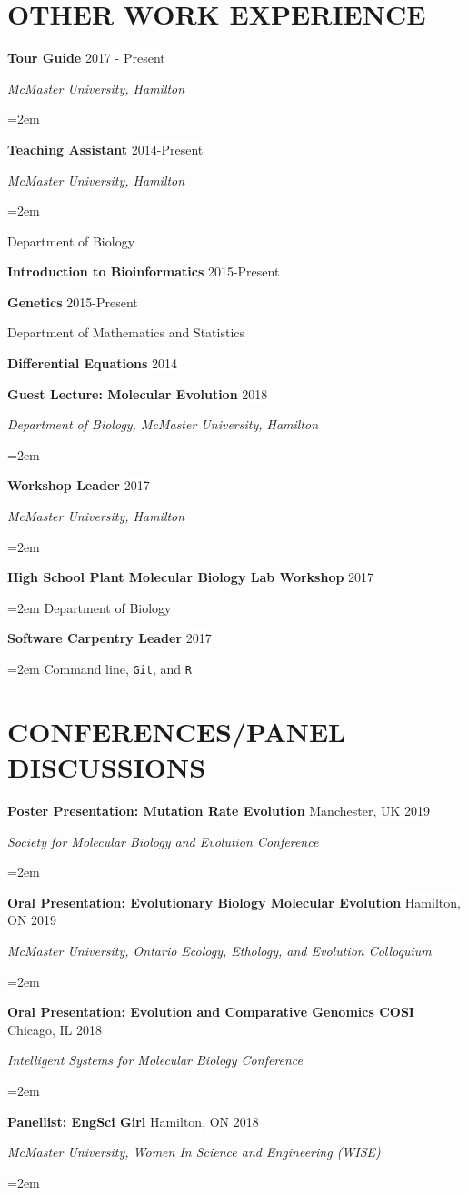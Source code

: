 \documentclass[paper=a4,fontsize=11pt]{scrartcl}	 			%
\renewcommand{\refname}{PUBLICATIONS}
\newcommand{\NewPart}[1]{\section*{\uppercase{#1}}}
\newcommand{\EducationEntry}[4]{
		\noindent \textbf{#1} \hfill 					%
		\colorbox{White}{%
			\parbox{10em}{%
			\hfill\color{Black}#2}} \par				%
		\noindent \textit{#3} \par					%
		\noindent\hangindent=2em\hangafter=0 \small #4 	%
		\normalsize \par}
\newcommand{\WorkEntry}[4]{						%
		\noindent \textbf{#1} \hfill 					%
		\colorbox{White}{\color{Black}#2} \par		%
		\noindent \textit{#3} \par					%
		\noindent\hangindent=2em\hangafter=0 \small #4 	%
		\normalsize \par}
\newcommand{\WorkEntryB}[3]{						%
	\noindent \textbf{#1} \hfill 					%
	\colorbox{White}{\color{Black}#2} \par		%
	\noindent \textit{#3} \par					%
	\noindent\hangindent=2em\hangafter=0 \small  	%
	\normalsize \par}
\newcommand{\WorkEntryD}[3]{						%
	\indent \textbf{#1} \hfill 					%
	\colorbox{White}{\color{Black}#2} \par		%
	\hangindent=2em\hangafter=0 \small  #3 \par
    \normalsize }
\newcommand{\WorkEntryE}[2]{						%
	\indent \indent \textbf{#1} \hfill 					%
	\colorbox{White}{\color{Black}#2} \par}
\begin{document}
%
\NewPart{Other Work Experience}{}
\WorkEntryB{Tour Guide}{2017 - Present}{McMaster University, Hamilton}
\WorkEntryB{Teaching Assistant}{2014-Present}{McMaster University, Hamilton}
\indent Department of Biology

	\WorkEntryE{Introduction to Bioinformatics}{2015-Present}
	\WorkEntryE{Genetics}{2015-Present}
	\indent Department of Mathematics and Statistics
	
	\WorkEntryE{Differential Equations}{2014}
\WorkEntryB{Guest Lecture: Molecular Evolution}{2018}{Department of Biology, McMaster University, Hamilton}
\WorkEntryB{Workshop Leader}{2017}{McMaster University, Hamilton}
	\WorkEntryD{High School Plant Molecular Biology Lab Workshop}{2017}{Department of Biology}
	\WorkEntryD{Software Carpentry Leader}{2017}{Command line, \texttt{Git}, and \texttt{R}}

%
\nocite{*}


%

%


\NewPart{Conferences/Panel Discussions}
\WorkEntryB{Poster Presentation: Mutation Rate Evolution}{Manchester, UK 2019}{Society for Molecular Biology and Evolution Conference}
\WorkEntryB{Oral Presentation: Evolutionary Biology Molecular Evolution}{Hamilton, ON 2019}{McMaster University,  Ontario Ecology, Ethology, and Evolution Colloquium}
\WorkEntryB{Oral Presentation: Evolution and Comparative Genomics COSI}{Chicago, IL 2018}{Intelligent Systems for Molecular Biology Conference}
\WorkEntryB{Panellist: EngSci Girl}{Hamilton, ON 2018}{McMaster University, Women In Science and Engineering (WISE)}
\end{document}
